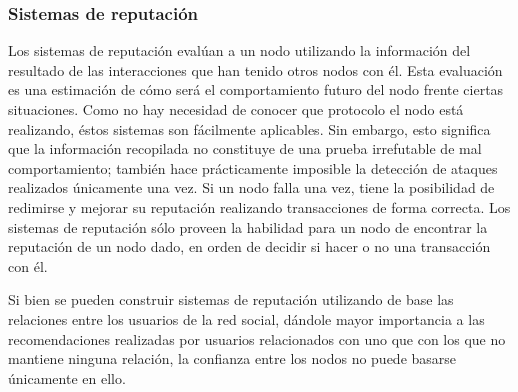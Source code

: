     \subsubsection{Sistemas de reputación}
    Los sistemas de reputación evalúan a un nodo utilizando la
    información del resultado de las interacciones que han tenido otros nodos con
    él. Esta evaluación es una estimación de cómo será el comportamiento futuro del
    nodo frente ciertas situaciones. Como no hay necesidad de conocer que protocolo
    el nodo está realizando, éstos sistemas son fácilmente aplicables. Sin embargo,
    esto significa que la información recopilada no constituye de una prueba
    irrefutable de mal comportamiento; también hace prácticamente imposible la
    detección de ataques realizados únicamente una vez. Si un nodo falla una vez,
    tiene la posibilidad de redimirse y mejorar su reputación realizando
    transacciones de forma correcta. Los sistemas de reputación sólo proveen la
    habilidad para un nodo de encontrar la reputación de un nodo dado, en orden de
    decidir si hacer o no una transacción con él.
    
    
     Si bien se pueden construir sistemas de reputación utilizando de base las
    relaciones entre los usuarios de la red social, dándole
    mayor importancia a las recomendaciones realizadas por usuarios relacionados
    con uno que con los que no mantiene ninguna relación, la confianza entre los
    nodos no puede basarse únicamente en ello. %
    
    
